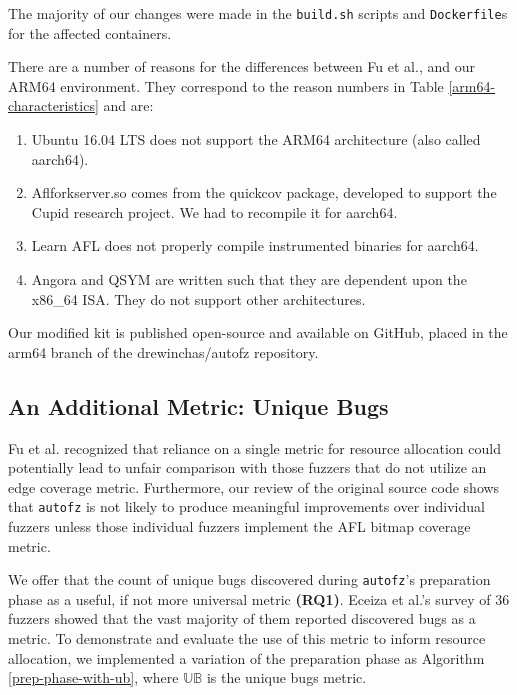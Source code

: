 The majority of our changes were made in the \texttt{build.sh} scripts and \texttt{Dockerfile}s
for the affected containers.

There are a number of reasons for the differences between Fu et al.,
and our ARM64 environment. They correspond to the reason numbers in Table 
\ref{arm64-characteristics} and are:

\begin{enumerate}
    \item Ubuntu 16.04 LTS does not support the ARM64 architecture (also called 
    aarch64).
    \item Aflforkserver.so comes from the quickcov package, developed to support 
    the Cupid research project\cite{guler_cupid_2020}. We had to recompile it for aarch64.
    \item Learn AFL does not properly compile instrumented binaries for aarch64.
    \item Angora and QSYM are written such that they are dependent upon the x86\_64 ISA.
    They do not support other architectures.
\end{enumerate}

Our modified kit is published open-source and available on GitHub, 
\cite{noauthor_drewinchasautofz_nodate} placed in the arm64 branch 
of the drewinchas/autofz repository.

\subsection{An Additional Metric: Unique Bugs}

Fu et al.\cite{fu_autofz_2023} recognized that reliance on a single metric for resource 
allocation could potentially lead to unfair comparison with those fuzzers that do not 
utilize an edge coverage metric. Furthermore, our review of the original source 
code shows that \texttt{autofz} is not likely to produce meaningful improvements over individual 
fuzzers unless those individual fuzzers implement the AFL bitmap coverage metric.

We offer that the count of unique bugs discovered during \texttt{autofz}'s preparation phase 
as a useful, if not more universal metric \textbf{(RQ1)}. Eceiza et al.\cite{eceiza_improving_2023}'s 
survey of 36 fuzzers showed that the vast majority of them reported discovered 
bugs as a metric. To demonstrate and evaluate the use of this metric to inform resource allocation, we 
implemented a variation of the preparation phase as Algorithm \ref{prep-phase-with-ub}, 
where $\mathbb{UB}$ is the unique bugs metric.

